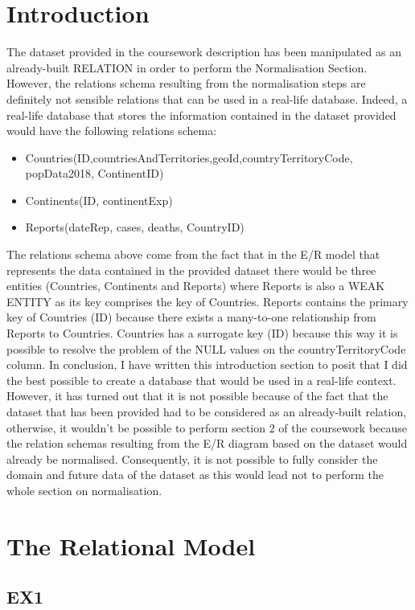 \documentclass{article}
\begin{document}
\section{Introduction}
The dataset provided in the coursework description has been manipulated as an already-built RELATION in order to perform the Normalisation Section. However, the relations schema resulting from the normalisation steps are definitely not sensible relations that can be used in a real-life database. Indeed, a real-life database that stores the information contained in the dataset provided would have the following relations schema:\\
\begin{itemize}
    \item Countries(ID,countriesAndTerritories,geoId,countryTerritoryCode, popData2018, ContinentID)
    \item Continents(ID, continentExp)
    \item Reports(dateRep, cases, deaths, CountryID)
\end{itemize}
The relations schema above come from the fact that in the E/R model that represents the data contained in the provided dataset there would be three entities (Countries, Continents and Reports) where Reports is also a WEAK ENTITY as its key comprises the key of Countries. Reports contains the primary key of Countries (ID) because there exists a many-to-one relationship from Reports to Countries. Countries has a surrogate key (ID) because this way it is possible to resolve the problem of the NULL values on the countryTerritoryCode column. 
In conclusion, I have written this introduction section to posit that I did the best possible to create a database that would be used in a real-life context. However, it has turned out that it is not possible because of the fact that the dataset that has been provided had to be considered as an already-built relation, otherwise, it wouldn't be possible to perform section 2 of the coursework because the relation schemas resulting from the E/R diagram based on the dataset would already be normalised. Consequently, it is not possible to fully consider the domain and future data of the dataset as this would lead not to perform the whole section on normalisation. 
 
\section{The Relational Model}
\subsection{EX1}
\end{document}

